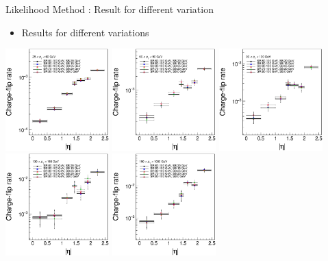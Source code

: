 \documentclass[mathserif,serif]{beamer}
\begin{document}
\begin{frame}{Likelihood Method : Result for different variation}
\begin{itemize}
\item Results for different variations
\end{itemize}
\includegraphics[width=0.3\textwidth]{data/plot/charge_flip/FitPlots/data_cf_comparison_0.eps}
\includegraphics[width=0.3\textwidth]{data/plot/charge_flip/FitPlots/data_cf_comparison_1.eps}
\includegraphics[width=0.3\textwidth]{data/plot/charge_flip/FitPlots/data_cf_comparison_2.eps} \\
\includegraphics[width=0.3\textwidth]{data/plot/charge_flip/FitPlots/data_cf_comparison_3.eps}
\includegraphics[width=0.3\textwidth]{data/plot/charge_flip/FitPlots/data_cf_comparison_4.eps}
\end{frame}
\end{document}
